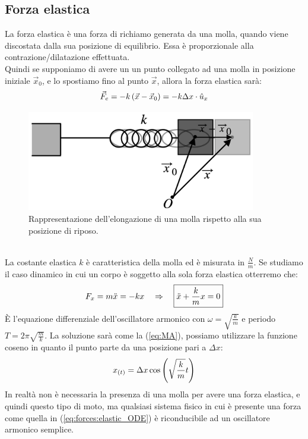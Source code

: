 \subsection{Forza elastica}
La forza elastica è una forza di richiamo generata da una molla, quando viene
discostata dalla sua posizione di equilibrio. Essa è proporzionale alla
contrazione/dilatazione effettuata.\\ Quindi se supponiamo di avere un un
punto collegato ad una molla in posizione iniziale $\vec x_0$, e lo spostiamo
fino al punto $\vec x$, allora la forza elastica sarà:
\begin{equation}
    \vec F_e = -k\left(\vec x-\vec x_0\right) = -k\Delta x\cdot\hat u_x
\end{equation}
\begin{figure}[htbp]
    \begin{center}
        \includegraphics[width=10cm]{images/molla.png}
        \caption{Rappresentazione dell'elongazione di una molla rispetto
        alla sua posizione di riposo.}
\end{center}
\label{fig:forces:elastic}
\end{figure}
\\
La costante elastica $k$ è caratteristica della molla ed è misurata in
$\frac Nm$. Se studiamo il caso dinamico in cui un corpo è soggetto alla
sola forza elastica otterremo che:
\begin{equation}
    F_x = m\ddot x = -kx \quad\Rightarrow\quad \boxed{\ddot x +\frac km x = 0}
\label{eq:forces:elastic_ODE}
\end{equation}
È l'equazione differenziale dell'oscillatore armonico con
$\omega = \sqrt{\frac km}$ e periodo $T =2\pi\sqrt{\frac mk}$.
La soluzione sarà come la (\ref{eq:MA}), possiamo utilizzare la funzione coseno in
quanto il punto parte da una posizione pari a $\Delta x$:
\begin{equation}
    x_{(t)} = \Delta x \cos\left( \sqrt{\frac km}t\right)
\label{eq:forces:elastic_x}
\end{equation}
In realtà non è necessaria la presenza di una molla per avere una forza
elastica, e quindi questo tipo di moto, ma qualsiasi sistema fisico in cui è
presente una forza come quella in (\ref{eq:forces:elastic_ODE}) è
riconducibile ad un oscillatore armonico semplice.